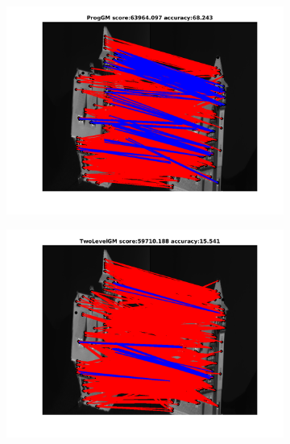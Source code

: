 \documentclass[
	fontsize=12pt,
	paper=a4,
	twoside=false,
	numbers=noenddot,
	plainheadsepline,
	toc=listof,
	toc=bibliography
]{scrartcl}
\begin{document}
\begin{figure}[h]	
	\begin{subfigure}[b]{0.3\textwidth}
		\centering
		\includegraphics[scale=0.25]{"fig_ver2608/RealImages/HouseSeq/anchor_descr/using_cpd_afftrafo/ext_solution/fi_11_ProgGM"}  
	\end{subfigure}%
	\begin{subfigure}[b]{0.3\textwidth}
		\centering
		\includegraphics[scale=0.25]{"fig_ver2608/RealImages/HouseSeq/anchor_descr/using_cpd_afftrafo/ext_solution/fi_11_TwoLevelGM"}  
	\end{subfigure} 
	\begin{subfigure}[b]{0.3\textwidth}
		\centering

\end{subfigure}
\end{figure}
\end{document}
